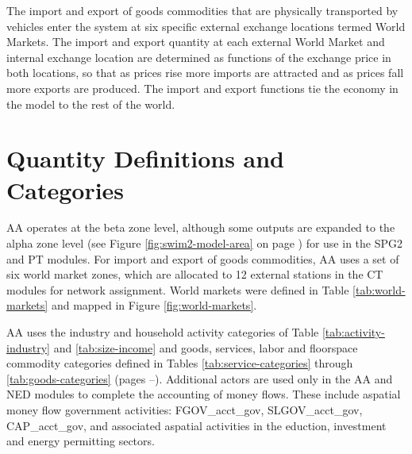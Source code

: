 The import and export of goods commodities that are physically transported by vehicles enter the system at six specific external exchange locations termed World Markets. The import and export quantity at each external World Market and internal exchange location are determined as functions of the exchange price in both locations, so that as prices rise more imports are attracted and as prices fall more exports are produced. The import and export functions tie the economy in the model to the rest of the world.

\section{Quantity Definitions and Categories}

AA operates at the beta zone level, although some outputs are expanded to the alpha zone level (see Figure \ref{fig:swim2-model-area} on page \pageref{fig:swim2-model-area}) for use in the SPG2 and PT modules. For import and export of goods commodities, AA uses a set of six world market zones, which are allocated to 12 external stations in the CT modules for network assignment. World markets were defined in Table \ref{tab:world-markets} and mapped in Figure \ref{fig:world-markets}. %

AA uses the industry and household activity categories of Table \ref{tab:activity-industry} and \ref{tab:size-income} and goods, services, labor and floorspace commodity categories defined in Tables \ref{tab:service-categories} through \ref{tab:goods-categories} (pages \pageref{tab:activity-industry}--\pageref{tab:goods-categories}). Additional actors are used only in the AA and NED modules to complete the accounting of money flows. These include aspatial money flow government activities: FGOV\_acct\_gov, SLGOV\_acct\_gov, CAP\_acct\_gov, and associated aspatial activities in the eduction, investment and energy permitting sectors.

